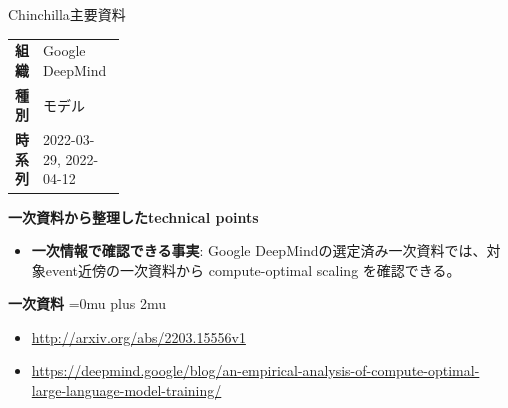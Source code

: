 \begin{technicalnote}{Chinchilla}{主要資料}
\begingroup
\begin{tabularx}{\linewidth}{@{}>{\bfseries}p{0.22\linewidth}X@{}}
組織 & Google DeepMind \\
種別 & モデル \\
時系列 & 2022-03-29, 2022-04-12 \\
\end{tabularx}
\smallskip
{\bfseries 一次資料から整理したtechnical points}
\begin{itemize}[leftmargin=1.5em,itemsep=0.35em]
\item \textbf{一次情報で確認できる事実}: Google DeepMindの選定済み一次資料では、対象event近傍の一次資料から compute-optimal scaling を確認できる。
\end{itemize}
\begin{minipage}{\linewidth}
\begin{samepage}
{\bfseries 一次資料}
\begingroup\sloppy
\Urlmuskip=0mu plus 2mu\relax
\begin{itemize}[leftmargin=1.5em,itemsep=0.25em]
\item {\scriptsize\url{http://arxiv.org/abs/2203.15556v1}}
\item {\scriptsize\url{https://deepmind.google/blog/an-empirical-analysis-of-compute-optimal-large-language-model-training/}}
\end{itemize}
\endgroup
\end{samepage}
\end{minipage}
\endgroup
\end{technicalnote}
\medskip

